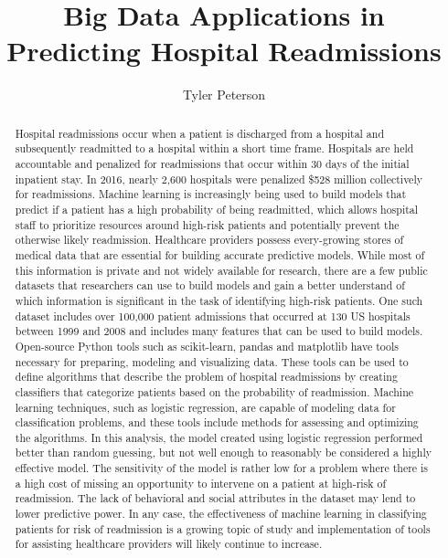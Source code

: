 \documentclass[sigconf]{acmart}
\begin{document}
\title{Big Data Applications in Predicting Hospital Readmissions}

\author{Tyler Peterson}

\renewcommand{\shortauthors}{G. v. Laszewski}

\begin{abstract}

  Hospital readmissions occur when a patient is discharged from a hospital and subsequently readmitted to a hospital within a short time frame. Hospitals are held accountable and penalized for readmissions that occur within 30 days of the initial inpatient stay. In 2016, nearly 2,600 hospitals were penalized \$528 million collectively for readmissions. Machine learning is increasingly being used to build models that predict if a patient has a high probability of being readmitted, which allows hospital staff to prioritize resources around high-risk patients and potentially prevent the otherwise likely readmission. Healthcare providers possess every-growing stores of medical data that are essential for building accurate predictive models. While most of this information is private and not widely available for research, there are a few public datasets that researchers can use to build models and gain a better understand of which information is significant in the task of identifying high-risk patients. One such dataset includes over 100,000 patient admissions that occurred at 130 US hospitals between 1999 and 2008 and includes many features that can be used to build models. Open-source Python tools such as scikit-learn, pandas and matplotlib have tools necessary for preparing, modeling and visualizing data. These tools can be used to define algorithms that describe the problem of hospital readmissions by creating classifiers that categorize patients based on the probability of readmission. Machine learning techniques, such as logistic regression, are capable of modeling data for classification problems, and these tools include methods for assessing and optimizing the algorithms. In this analysis, the model created using logistic regression performed better than random guessing, but not well enough to reasonably be considered a highly effective model. The sensitivity of the model is rather low for a problem where there is a high cost of missing an opportunity to intervene on a patient at high-risk of readmission. The lack of behavioral and social attributes in the dataset may lend to lower predictive power. In any case, the effectiveness of machine learning in classifying patients for risk of readmission is a growing topic of study and implementation of tools for assisting healthcare providers will likely continue to increase.
 
\end{abstract}
\end{document}
